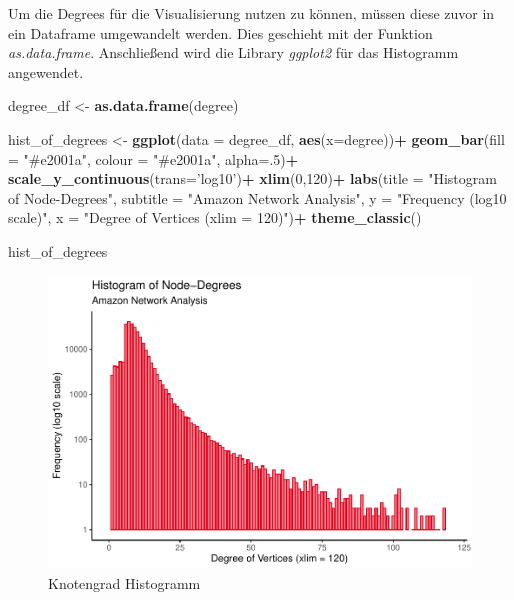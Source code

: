 \documentclass[
  12 pt,
]{article}
\newenvironment{Shaded}{\begin{snugshade}}{\end{snugshade}}
\newcommand{\DataTypeTok}[1]{\textcolor[rgb]{0.13,0.29,0.53}{#1}}
\newcommand{\DecValTok}[1]{\textcolor[rgb]{0.00,0.00,0.81}{#1}}
\newcommand{\KeywordTok}[1]{\textcolor[rgb]{0.13,0.29,0.53}{\textbf{#1}}}
\newcommand{\NormalTok}[1]{#1}
\newcommand{\OperatorTok}[1]{\textcolor[rgb]{0.81,0.36,0.00}{\textbf{#1}}}
\newcommand{\StringTok}[1]{\textcolor[rgb]{0.31,0.60,0.02}{#1}}
\begin{document}
Um die Degrees für die Visualisierung nutzen zu können, müssen diese
zuvor in ein Dataframe umgewandelt werden. Dies geschieht mit der
Funktion \emph{as.data.frame}. Anschließend wird die Library
\emph{ggplot2} für das Histogramm angewendet.

\begin{Shaded}
\begin{Highlighting}[]
\NormalTok{degree_df <-}\StringTok{ }\KeywordTok{as.data.frame}\NormalTok{(degree)}


\NormalTok{hist_of_degrees <-}\StringTok{ }\KeywordTok{ggplot}\NormalTok{(}\DataTypeTok{data =}\NormalTok{ degree_df, }\KeywordTok{aes}\NormalTok{(}\DataTypeTok{x=}\NormalTok{degree))}\OperatorTok{+}
\StringTok{  }\KeywordTok{geom_bar}\NormalTok{(}\DataTypeTok{fill =} \StringTok{"#e2001a"}\NormalTok{, }\DataTypeTok{colour =} \StringTok{"#e2001a"}\NormalTok{, }\DataTypeTok{alpha=}\NormalTok{.}\DecValTok{5}\NormalTok{)}\OperatorTok{+}
\StringTok{  }\KeywordTok{scale_y_continuous}\NormalTok{(}\DataTypeTok{trans=}\StringTok{'log10'}\NormalTok{)}\OperatorTok{+}
\StringTok{  }\KeywordTok{xlim}\NormalTok{(}\DecValTok{0}\NormalTok{,}\DecValTok{120}\NormalTok{)}\OperatorTok{+}
\StringTok{  }\KeywordTok{labs}\NormalTok{(}\DataTypeTok{title =} \StringTok{"Histogram of Node-Degrees"}\NormalTok{, }
       \DataTypeTok{subtitle =} \StringTok{"Amazon Network Analysis"}\NormalTok{, }
       \DataTypeTok{y =} \StringTok{"Frequency (log10 scale)"}\NormalTok{, }
       \DataTypeTok{x =} \StringTok{"Degree of Vertices (xlim = 120)"}\NormalTok{)}\OperatorTok{+}
\StringTok{  }\KeywordTok{theme_classic}\NormalTok{()}

\NormalTok{hist_of_degrees}
\end{Highlighting}
\end{Shaded}

\begin{figure}
\centering
\includegraphics{BUBECK_FERDINAND_SNA_Assignment_files/figure-latex/viz-1.pdf}
\caption{Knotengrad Histogramm}
\end{figure}
\end{document}
